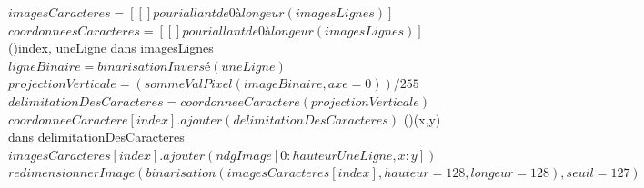 \documentclass[a4paper]{article}
\begin{document}
\begin{algorithm}
				$imagesCaracteres = [[ ] pour i allant de 0 à longeur(imagesLignes)]$\;
				\BlankLine
				$coordonneesCaracteres = [[] pour i allant de 0 à longeur(imagesLignes)]$\;
				\BlankLine
				\For(){index, uneLigne dans imagesLignes}
				{
					$ligneBinaire = binarisationInversé(uneLigne)$\;
					$projectionVerticale = (sommeValPixel(imageBinaire, axe=0)) / 255$\;
					$delimitationDesCaracteres = coordonneeCaractere(projectionVerticale)$\;
					\BlankLine
					$coordonneeCaractere[index].ajouter(delimitationDesCaracteres)$\;
    				\For(){(x,y) dans delimitationDesCaracteres}
					{
						$imagesCaracteres[index].ajouter(ndgImage[0:hauteurUneLigne, x:y])$\;
					}
					$redimensionnerImage(binarisation(imagesCaracteres[index],hauteur = 128,longeur = 128), seuil = 127)$\;
					\BlankLine
				}
			\end{algorithm}
			\newpage
\end{document}
